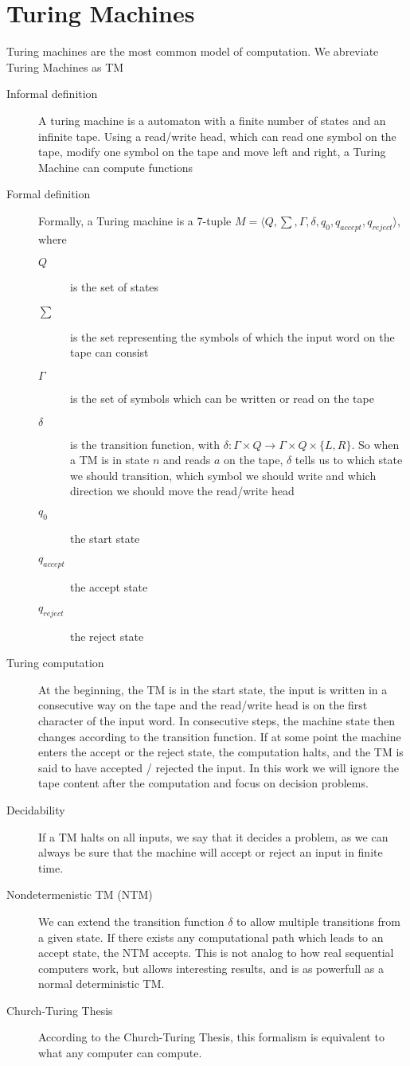 \section{Turing Machines}\label{sec:turing-machines}
Turing machines are the most common model of computation. We abreviate Turing Machines as TM
\begin{description}
    \item[Informal definition] A turing machine is a automaton with a finite number of states and an infinite tape. Using a read/write head, which can read one symbol on the tape, modify one symbol on the tape and move left and right, a Turing Machine can compute functions
    \item[Formal definition] Formally, a Turing machine is a 7-tuple $M = \langle  Q, \sum, \Gamma, \delta, q_0, q_{accept}, q_{reject}\rangle$, where
    \begin{description}
        \item[$Q$] is the set of states
        \item[$\sum$] is the set representing the symbols of which the input word on the tape can consist
        \item[$\Gamma$] is the set of symbols which can be written or read on the tape
        \item[$\delta$] is the transition function, with $\delta : \Gamma \times Q \to \Gamma \times Q \times \{L, R\}$. So when a TM is in state $n$ and reads $a$ on the tape, $\delta$ tells us to which state we should transition, which symbol we should write and which direction we should move the read/write head
        \item[$q_0$] the start state
        \item[$q_{accept}$] the accept state
        \item[$q_{reject}$] the reject state
    \end{description}
    \item[Turing computation] At the beginning, the TM is in the start state, the input is written in a consecutive way on the tape and the read/write head is on the first character of the input word. In consecutive steps, the machine state then changes according to the transition function. If at some point the machine enters the accept or the reject state, the computation halts, and the TM is said to have accepted / rejected the input. In this work we will ignore the tape content after the computation and focus on decision problems.
    \item[Decidability] If a TM halts on all inputs, we say that it decides a problem, as we can always be sure that the machine will accept or reject an input in finite time.
    \item[Nondetermenistic TM (NTM)] We can extend the transition function $\delta$ to allow multiple transitions from a given state. If there exists any computational path which leads to an accept state, the NTM accepts. This is not analog to how real sequential computers work, but allows interesting results, and is as powerfull as a normal deterministic TM.
    \item[Church-Turing Thesis] According to the Church-Turing Thesis, this formalism is equivalent to what any computer can compute.
\end{description}
